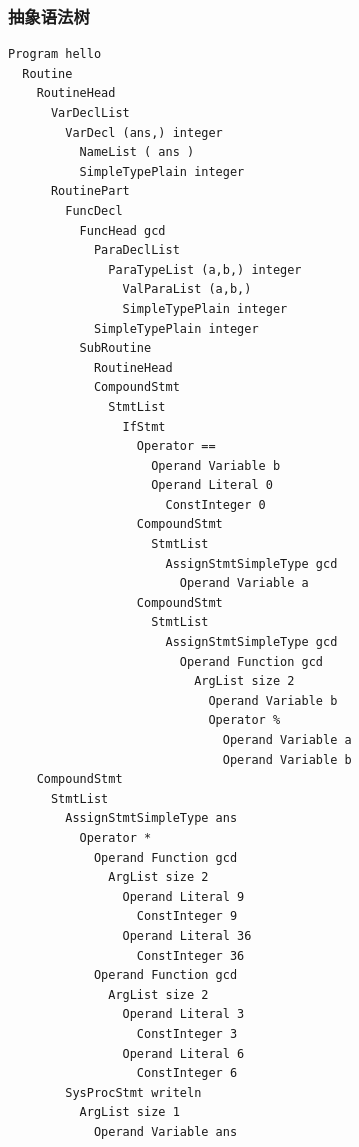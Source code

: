 \documentclass{article}
\begin{document}
\subsubsection{抽象语法树}
\begin{lstlisting}
Program hello
  Routine
    RoutineHead
      VarDeclList
        VarDecl (ans,) integer
          NameList ( ans )
          SimpleTypePlain integer
      RoutinePart
        FuncDecl
          FuncHead gcd
            ParaDeclList
              ParaTypeList (a,b,) integer
                ValParaList (a,b,)
                SimpleTypePlain integer
            SimpleTypePlain integer
          SubRoutine
            RoutineHead
            CompoundStmt
              StmtList
                IfStmt
                  Operator ==
                    Operand Variable b
                    Operand Literal 0
                      ConstInteger 0
                  CompoundStmt
                    StmtList
                      AssignStmtSimpleType gcd
                        Operand Variable a
                  CompoundStmt
                    StmtList
                      AssignStmtSimpleType gcd
                        Operand Function gcd
                          ArgList size 2
                            Operand Variable b
                            Operator %
                              Operand Variable a
                              Operand Variable b
    CompoundStmt
      StmtList
        AssignStmtSimpleType ans
          Operator *
            Operand Function gcd
              ArgList size 2
                Operand Literal 9
                  ConstInteger 9
                Operand Literal 36
                  ConstInteger 36
            Operand Function gcd
              ArgList size 2
                Operand Literal 3
                  ConstInteger 3
                Operand Literal 6
                  ConstInteger 6
        SysProcStmt writeln
          ArgList size 1
            Operand Variable ans
\end{lstlisting}
\end{document}
